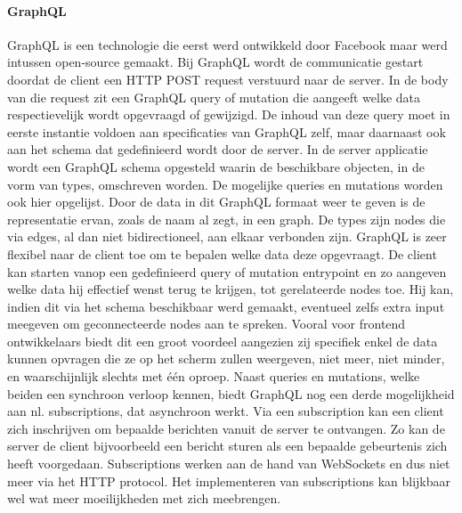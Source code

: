 \paragraph{GraphQL}
GraphQL is een technologie die eerst werd ontwikkeld door Facebook maar werd intussen open-source gemaakt. Bij GraphQL wordt de communicatie gestart doordat de
client een HTTP POST request verstuurd naar de server. In de body van die request zit een GraphQL query of mutation die aangeeft welke data respectievelijk wordt
opgevraagd of gewijzigd. De inhoud van deze query moet in eerste instantie voldoen aan specificaties van GraphQL zelf, maar daarnaast ook aan het schema dat gedefinieerd
wordt door de server. In de server applicatie wordt een GraphQL schema opgesteld waarin de beschikbare objecten, in de vorm van types, omschreven worden. De mogelijke
queries en mutations worden ook hier opgelijst. Door de data in dit GraphQL formaat weer te geven is de representatie ervan, zoals de naam al zegt, in een graph.
De types zijn nodes die via edges, al dan niet bidirectioneel, aan elkaar verbonden zijn. GraphQL is zeer flexibel naar de client toe om te bepalen welke data deze opgevraagt.
De client kan starten vanop een gedefinieerd query of mutation entrypoint en zo aangeven welke data hij effectief wenst terug te krijgen, tot gerelateerde nodes toe.
Hij kan, indien dit via het schema beschikbaar werd gemaakt, eventueel zelfs extra input meegeven om geconnecteerde nodes aan te spreken. Vooral voor frontend ontwikkelaars
biedt dit een groot voordeel aangezien zij specifiek enkel de data kunnen opvragen die ze op het scherm zullen weergeven, niet meer, niet minder, en waarschijnlijk slechts met \'e\'en oproep.
Naast queries en mutations, welke beiden een synchroon verloop kennen, biedt GraphQL nog een derde mogelijkheid aan nl. subscriptions, dat asynchroon werkt.
Via een subscription kan een client zich inschrijven om bepaalde berichten vanuit de server te ontvangen. Zo kan de server de client bijvoorbeeld een bericht sturen als
een bepaalde gebeurtenis zich heeft voorgedaan. Subscriptions werken aan de hand van WebSockets en dus niet meer via het HTTP protocol. Het implementeren van subscriptions
kan blijkbaar wel wat meer moeilijkheden met zich meebrengen.\newline
~\autocite{graphql,redhatapissoaprestgraphqlgrpc,graphqlfrontend,graphqlsubscriptions}\\

